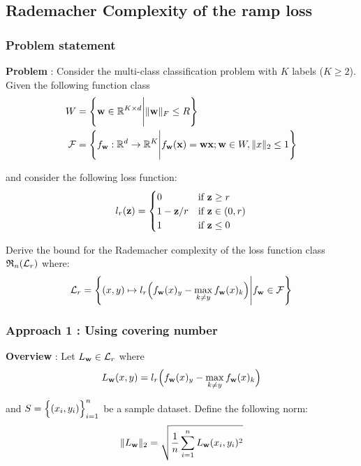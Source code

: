\newpage
\subsection{Rademacher Complexity of the ramp loss}
\label{sec:rad_complexity_of_ramp_loss}

\subsubsection{Problem statement}
\textbf{Problem} : Consider the multi-class classification problem with $K$ labels ($K\ge2$). Given the following function class
\begin{align*}
    W  &= \Bigg\{ 
        {\bf w}\in \mathbb{R}^{K\times d} \Bigg| \|{\bf w}\|_F \le R
     \Bigg\} \\
    \mathcal{F} &= \Bigg\{ 
        f_{{\bf w}}:\mathbb{R}^d \to \mathbb{R}^{K} \Bigg| f_{\bf w}({\bf x}) = {\bf wx}; {\bf w}\in W, \|x\|_2\le 1
     \Bigg\}
\end{align*}

\noindent and consider the following loss function:
\begin{align*}
    l_r({\bf z}) &= \begin{cases}
        0 & \text{if } {\bf z} \ge r \\
        1 - {\bf z}/r &\text{if } {\bf z} \in (0,r) \\ 
        1 &\text{if } {\bf z} \le 0
    \end{cases} \\
\end{align*}

\noindent Derive the bound for the Rademacher complexity of the loss function class $\mathfrak{R}_n(\mathcal{L}_r)$ where:
\begin{align*}
    \mathcal{L}_r = \Bigg\{ 
        (x, y)\mapsto l_r\Big(  f_{\bf w}(x)_y - \max_{k\ne y} f_{\bf w}(x)_k  \Big) \Bigg| f_{{\bf w}} \in \mathcal{F} 
     \Bigg\}
\end{align*}

\subsubsection{Approach 1 : Using covering number}
\noindent\textbf{Overview} : Let $L_{\bf w} \in \mathcal{L}_r$ where
\begin{align*}
    L_{\bf w}(x,y) =  l_r\Big(  f_{\bf w}(x)_y - \max_{k\ne y} f_{\bf w}(x)_k  \Big)
\end{align*}


\noindent and $S=\Big\{ (x_i, y_i) \Big\}_{i=1}^n$ be a sample dataset. Define the following norm:
\begin{align*}
    \|L_{\bf w}\|_2 = \sqrt{
        \frac{1}{n} \sum_{i=1}^n L_{\bf w}(x_i, y_i)^2
    }
\end{align*}

